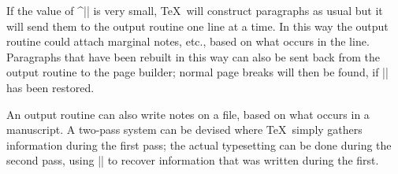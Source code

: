 {If the value of\/ ^|\vsize| is very small, \TeX\ will construct paragraphs
as usual but it will send them to the output routine one line at a time.
In this way the output routine could attach marginal notes, etc., based
on what occurs in the line. Paragraphs that have been rebuilt in this
way can also be sent back from the output routine to the page builder;
normal page breaks will then be found, if\/ |\vsize| has been restored.

An output routine can also write notes on a file, based on what occurs in
a manuscript. A two-pass system can be devised where \TeX\ simply gathers
information during the first pass; the actual typesetting can be done during
the second pass, using |\read| to recover information that was written
during the first.

}
